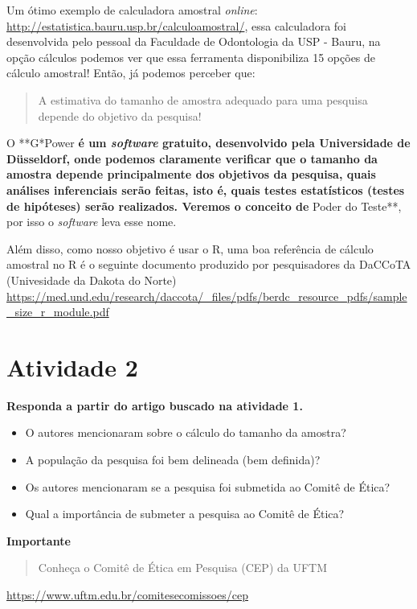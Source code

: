 \documentclass[
]{book}
\begin{document}
Um ótimo exemplo de calculadora amostral \emph{online}: \url{http://estatistica.bauru.usp.br/calculoamostral/}, essa calculadora foi desenvolvida pelo pessoal da Faculdade de Odontologia da USP - Bauru, na opção cálculos podemos ver que essa ferramenta disponibiliza 15 opções de cálculo amostral! Então, já podemos perceber que:

\begin{quote}
A estimativa do tamanho de amostra adequado para uma pesquisa depende do objetivo da pesquisa!
\end{quote}

O **G*Power\textbf{ é um \emph{software} gratuito, desenvolvido pela Universidade de Düsseldorf, onde podemos claramente verificar que o tamanho da amostra depende principalmente dos objetivos da pesquisa, quais análises inferenciais serão feitas, isto é, quais testes estatísticos (testes de hipóteses) serão realizados. Veremos o conceito de }Poder do Teste**, por isso o \emph{software} leva esse nome.

Além disso, como nosso objetivo é usar o R, uma boa referência de cálculo amostral no R é o seguinte documento produzido por pesquisadores da DaCCoTA (Univesidade da Dakota do Norte) \url{https://med.und.edu/research/daccota/_files/pdfs/berdc_resource_pdfs/sample_size_r_module.pdf}

\section{Atividade 2}\label{atividade-2}

\textbf{Responda a partir do artigo buscado na atividade 1.}

\begin{itemize}
\item
  O autores mencionaram sobre o cálculo do tamanho da amostra?
\item
  A população da pesquisa foi bem delineada (bem definida)?
\item
  Os autores mencionaram se a pesquisa foi submetida ao Comitê de Ética?
\item
  Qual a importância de submeter a pesquisa ao Comitê de Ética?
\end{itemize}

\textbf{Importante}

\begin{quote}
Conheça o Comitê de Ética em Pesquisa (CEP) da UFTM
\end{quote}

\url{https://www.uftm.edu.br/comitesecomissoes/cep}
\end{document}
